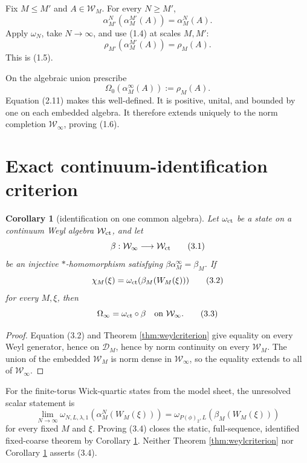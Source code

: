 \documentclass[11pt,a4paper]{article}
\newcommand{\W}{\mathcal W}
\newtheorem{corollary}[theorem]{Corollary}
\begin{document}

Fix \(M\le M'\) and \(A\in\W_M\).  For every \(N\ge M'\),
\[
 \alpha_{M'}^N(\alpha_M^{M'}(A))=\alpha_M^N(A).                \tag{2.10}
\]
Apply \(\omega_N\), take \(N\to\infty\), and use (1.4) at scales
\(M,M'\):
\[
 \rho_{M'}(\alpha_M^{M'}(A))=\rho_M(A).                        \tag{2.11}
\]
This is (1.5).


On the algebraic union prescribe
\[
 \Omega_0(\alpha_M^\infty(A)):=\rho_M(A).                      \tag{2.12}
\]
Equation (2.11) makes this well-defined.  It is positive, unital, and bounded by
one on each embedded algebra.  It therefore extends uniquely to the norm completion
\(\W_\infty\), proving (1.6). \QedStep

\section{Exact continuum-identification criterion}

\begin{corollary}[identification on one common algebra]\label{cor:identify}
Let \(\omega_{\rm ct}\) be a state on a continuum Weyl algebra \(\W_{\rm ct}\),
and let
\[
 \beta:\W_\infty\longrightarrow\W_{\rm ct}                    \tag{3.1}
\]
be an injective \( * \)-homomorphism satisfying
\(\beta\alpha_M^\infty=\beta_M\).  If
\[
 \chi_M(\xi)=\omega_{\rm ct}(\beta_M(W_M(\xi)))                \tag{3.2}
\]
for every \(M,\xi\), then
\[
 \Omega_\infty=\omega_{\rm ct}\circ\beta
 \quad\hbox{on }\W_\infty.                                    \tag{3.3}
\]
\end{corollary}

\begin{proof}
Equation (3.2) and Theorem \ref{thm:weylcriterion} give equality on every Weyl
generator, hence on \(\mathcal D_M\), hence by norm continuity on every
\(\W_M\).  The union of the embedded \(\W_M\) is norm dense in
\(\W_\infty\), so the equality extends to all of \(\W_\infty\).
\end{proof}

\begin{remark}
For the finite-torus Wick-quartic states from the model sheet, the unresolved scalar
statement is
\[
 \lim_{N\to\infty}
 \omega_{N,L,\lambda,1}(\alpha_M^N(W_M(\xi)))
 =
 \omega_{P(\phi)_2,L}(\beta_M(W_M(\xi)))                       \tag{3.4}
\]
for every fixed \(M\) and \(\xi\).  Proving (3.4) closes the static,
full-sequence, identified fixed-coarse theorem by Corollary \ref{cor:identify}.
Neither Theorem \ref{thm:weylcriterion} nor Corollary \ref{cor:identify}
asserts (3.4).
\end{remark}
\end{document}
